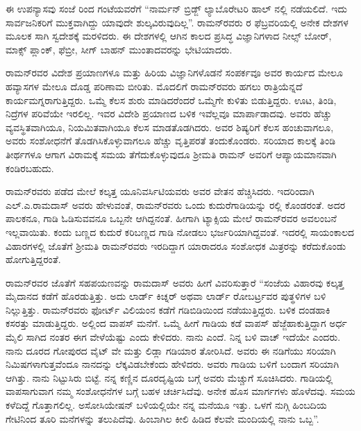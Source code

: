 \newpage

ಈ ಉಪನ್ಯಾಸವು ಸಂಜೆ  ರಿಂದ  ಗಂಟೆಯವರೆಗೆ “ನಾರ್ಮನ್ ಬ್ರಿಡ್ಜ್ ಲ್ಯಾಬೊರೇಟರಿ ಹಾಲ್ ನಲ್ಲಿ ನಡೆಯಲಿದೆ. ಇದು ಸಾರ್ವಜನಿಕರಿಗೆ ಮುಕ್ತವಾಗಿದ್ದು ಯಾವುದೇ ಶುಲ್ಕವಿರುವುದಿಲ್ಲ”. ರಾಮನ್‍ರವರು ರ ಫೆಬ್ರವರಿಯಲ್ಲಿ ಅನೇಕ ದೇಶಗಳ ಮೂಲಕ ಸಾಗಿ ಸ್ವದೇಶಕ್ಕೆ ಮರಳಿದರು. ಈ ದೇಶಗಳಲ್ಲಿ ಆಗಿನ ಕಾಲದ ಪ್ರಸಿದ್ಧ ವಿಜ್ಞಾನಿಗಳಾದ ನೀಲ್ಸ್ ಬೋರ್, ಮಾಕ್ಸ್ ಪ್ಲಾಂಕ್, ಫೆಬ್ರೀ, ಸೀಗ್ ಬಾಹನ್ ಮುಂತಾದವರನ್ನು ಭೇಟಿಯಾದರು.

\vskip 1pt

ರಾಮನ್‍ರವರ ವಿದೇಶ ಪ್ರಯಾಣಗಳೂ ಮತ್ತು ಹಿರಿಯ ವಿಜ್ಞಾನಿಗಳೊಡನೆ ಸಂಪರ್ಕವೂ ಅವರ ಕಾರ್ಯದ ಮೇಲೂ ಹವ್ಯಾಸಗಳ ಮೇಲೂ ದೊಡ್ಡ ಪರಿಣಾಮ ಬೀರಿತು. ಮೊದಲಿಗೆ ರಾಮನ್‍ರವರು ಹಗಲು ರಾತ್ರಿಯೆನ್ನದೆ ಕಾರ್ಯಮಗ್ನರಾಗುತ್ತಿದ್ದರು. ಒಮ್ಮೆ ಕೆಲಸ ಶುರು ಮಾಡಿದರೆಂದರೆ ಒಮ್ಮೆಗೇ ಕುಳಿತು ಬಿಡುತ್ತಿದ್ದರು. ಊಟ, ತಿಂಡಿ, ನಿದ್ರೆಗಳ ಪರಿವೆಯೇ ಇರಲಿಲ್ಲ. ಇವರ ವಿದೇಶಿ ಪ್ರಯಾಣದ ಬಳಿಕ ಇವೆಲ್ಲವೂ ಮಾರ್ಪಾಡಾದವು. ಅವರು ಹೆಚ್ಚು ವ್ಯವಸ್ಥಿತವಾಗಿಯೂ, ನಿಯಮಿತವಾಗಿಯೂ ಕೆಲಸ ಮಾಡತೊಡಗಿದರು. ಅವರ ಶಿಷ್ಯರಿಗೆ ಕೆಲಸ ಹಂಚುವಾಗಲೂ, ಅವರು ಸಂಶೋಧನೆಗೆ ತೊಡಗಿಸಿಕೊಳ್ಳುವಾಗಲೂ ಹೆಚ್ಚು ವೃತ್ತಿಪರತೆ ತಂದುಕೊಂಡರು. ಸರಿಯಾದ ಕಾಲಕ್ಕೆ ತಿಂಡಿ ತೀರ್ಥಗಳೂ ಆಗಾಗ ವಿರಾಮಕ್ಕೆ ಸಮಯ ತೆಗೆದುಕೊಳ್ಳುವುದೂ ಶ‍್ರೀಮತಿ ರಾಮನ್ ಅವರಿಗೆ ಆಪ್ಯಾಯಮಾನವಾಗಿ ಕಂಡಿರಬಹುದು. 

\vskip 1pt

ರಾಮನ್‍ರವರು  ಪಡೆದ ಮೇಲೆ ಕಲ್ಕತ್ತ ಯೂನಿವರ್ಸಿಟಿಯವರು ಅವರ ವೇತನ ಹೆಚ್ಚಿಸಿದರು. ಇದರಿಂದಾಗಿ ಎಲ್.ಎ.ರಾಮದಾಸ್ ಅವರು ಹೇಳುವಂತೆ, ರಾಮನ್‍ರವರು ಒಂದು ಕುದುರೆಗಾಡಿಯನ್ನು ರಲ್ಲಿ ಕೊಂಡರಂತೆ. ಅದರ ಪಾಲಕನೂ, ಗಾಡಿ ಓಡಿಸುವವನೂ ಒಬ್ಬನೇ ಆಗಿದ್ದನಂತೆ. ಹೀಗಾಗಿ ಟ್ಯಾಕ್ಸಿಯ ಮೇಲೆ ರಾಮನ್‍ರವರ ಅವಲಂಬನೆ ಇಲ್ಲವಾಯಿತು. ಕಂದು ಬಣ್ಣದ ಕುದುರೆ ಕರಿಬಣ್ಣದ ಗಾಡಿ ನೋಡಲು ಭರ್ಜರಿಯಾಗಿದ್ದವಂತೆ. ಇದರಲ್ಲಿ ಸಾಯಂಕಾಲದ ವಿಹಾರಗಳಲ್ಲಿ ಜೊತೆಗೆ ಶ‍್ರೀಮತಿ ರಾಮನ್‍ರವರು ಇರದಿದ್ದಾಗ ಯಾರಾದರೂ ಸಂಶೋಧಕ ಮಿತ್ರರನ್ನು ಕರೆದುಕೊಂಡು ಹೋಗುತ್ತಿದ್ದರಂತೆ. 

ರಾಮನ್‍ರವರ ಜೊತೆಗೆ ಸಹಪಯಣವನ್ನು ರಾಮದಾಸ್ ಅವರು ಹೀಗೆ ವಿವರಿಸುತ್ತಾರೆ \enginline{-} “ಸಂಜೆಯ ವಿಹಾರವು ಕಲ್ಕತ್ತ ಮೈದಾನದ ಕಡೆಗೆ ಹೊರಡುತ್ತಿತ್ತು. ಅದು ಲಾರ್ಡ್ ಕಿಚ್ನರ್ ಅಥವಾ ಲಾರ್ಡ್ ರೋಬರ್ಟ್ರವರ ಪುತ್ಥಳಿಗಳ ಬಳಿ ನಿಲ್ಲುತ್ತಿತ್ತು. ರಾಮನ್‍ರವರು ಫೋರ್ಟ್ ವಿಲಿಯಂನ ಕಡೆಗೆ ಗಡಿಬಿಡಿಯಿಂದ ನಡೆಯುತ್ತಿದ್ದರು. ಬಳಿಕ ದಂಡಹಾಕಿ ಕಸರತ್ತು ಮಾಡುತ್ತಿದ್ದರು. ಅಲ್ಲಿಂದ ವಾಪಸ್ ಮನೆಗೆ. ಒಮ್ಮೆ ಹೀಗೆ ಗಾಡಿಯ ಕಡೆ ವಾಪಸ್ ಹೆಜ್ಜೆಹಾಕುತ್ತಿದ್ದಾಗ ಅರ್ಧ ಮೈಲಿ ಸಾಗಿದ ನಂತರ ಈಗ ವೇಳೆಯೆಷ್ಟು ಎಂದು ಕೇಳಿದರು. ನಾನು  ಎಂದೆ. ನಿನ್ನ ಬಳಿ ವಾಚ್ ಇದೆಯೇ ಎಂದರು. ನಾನು ದೂರದ ಗೋಪುರದ ವೈಟ್ ವೇ ಮತ್ತು ಲಿಡ್ಲಾ ಗಡಿಯಾರ ತೋರಿಸಿದೆ. ಅವರು ಈ ನಡಿಗೆಯು ಸರಿಯಾಗಿ  ನಿಮಿಷಗಳಾಗುತ್ತವೆಂದೂ ನಾನದನ್ನು ಲೆಕ್ಕವಿಡಬೇಕೆಂದು ಹೇಳಿದರು. ಅವರು ಗಾಡಿಯ ಬಳಿಗೆ ಬಂದಾಗ ಸರಿಯಾಗಿ  ಆಗಿತ್ತು. ನಾನು ನಿಟ್ಟುಸಿರು ಬಿಟ್ಟೆ. ನನ್ನ ಕಣ್ಣಿನ ದೂರದೃಷ್ಟಿಯ ಬಗ್ಗೆ ಅವರು ಮೆಚ್ಚುಗೆ ಸೂಚಿಸಿದರು. ಗಾಡಿಯಲ್ಲಿ ವಾಪಸಾಗುವಾಗ ನಮ್ಮ ಸಂಶೋಧನೆಗಳ ಬಗ್ಗೆ ಬಹಳ ಚರ್ಚಿಸಿದೆವು. ಅನೇಕ ಹೊಸ ಮಾರ್ಗಗಳು ಹೊಳೆದವು. ಸಮಯ ಕಳೆದಿದ್ದೆ ಗೊತ್ತಾಗಲಿಲ್ಲ. ಅಸೋಸಿಯೇಷನ್ ಬಳಿಯಲ್ಲಿಯೇ ನನ್ನ ಮನೆಯೂ ಇತ್ತು. ಒಳಗೆ ನುಗ್ಗಿ ಹಿಂಬದಿಯ ಗೇಟಿನಿಂದ ತೂರಿ ಮನೆಗಳನ್ನು ತಲುಪಿದೆವು. ಹಿಂಬಾಗಿಲ ಕೀಲಿ ಹಿಡಿದ ಕೆಲವೇ ಮಂದಿಯಲ್ಲಿ ನಾನು ಒಬ್ಬ”.


